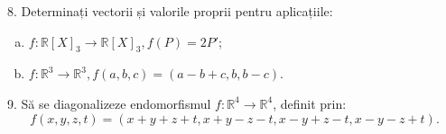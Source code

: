 \documentclass[11pt,a4paper]{article}
\newcommand\RR{\mathbb{R}}
\theoremstyle{dotless}
\theoremstyle{dotlessdr}
\begin{document}
\vspace{1cm}

8. Determinați vectorii și valorile proprii pentru aplicațiile:
\begin{enumerate}[(a)]
\item $f : \RR[X]_3 \to \RR[X]_3, f(P) = 2P'$;
\item $f : \RR^3 \to \RR^3, f(a, b, c) = (a - b + c, b, b - c)$.
\end{enumerate}

\vspace{1cm}

9. Să se diagonalizeze endomorfismul $f : \RR^4 \to \RR^4$, definit prin:
\[
  f(x, y, z, t) = (x + y + z + t, x + y - z - t, x - y + z - t, x - y - z + t).
\]
\end{document}
